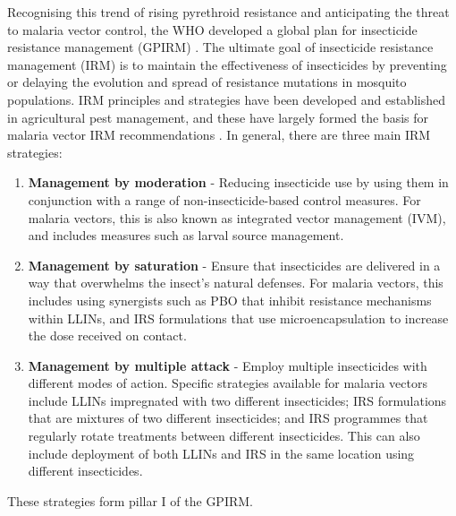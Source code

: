 \documentclass[a4paper,11pt,abstracton,hidelinks]{scrartcl}
\begin{document}
Recognising this trend of rising pyrethroid resistance and anticipating the threat to malaria vector control, the WHO developed a global plan for insecticide resistance management (GPIRM) \citep{WHO2012GPIRM}. 
%
The ultimate goal of insecticide resistance management (IRM) is to maintain the effectiveness of insecticides by preventing or delaying the evolution and spread of resistance mutations in mosquito populations. 
%
IRM principles and strategies have been developed and established in agricultural pest management, and these have largely formed the basis for malaria vector IRM recommendations \citep{Georghiou2005,Sternberg2018}. 
%
In general, there are three main IRM strategies:
%
\begin{enumerate}
%
\item \textbf{Management by moderation} - Reducing insecticide use by using them in conjunction with a range of non-insecticide-based control measures. For malaria vectors, this is also known as integrated vector management (IVM), and includes measures such as larval source management.
%
\item \textbf{Management by saturation} - Ensure that insecticides are delivered in a way that overwhelms the insect's natural defenses. For malaria vectors, this includes using synergists such as PBO that inhibit resistance mechanisms within LLINs, and  IRS formulations that use microencapsulation to increase the dose received on contact.
%
\item \textbf{Management by multiple attack} - Employ multiple insecticides with different modes of action. Specific strategies available for malaria vectors include LLINs impregnated with two different insecticides; IRS formulations that are mixtures of two different insecticides; and IRS programmes that regularly rotate treatments between different insecticides. This can also include deployment of both LLINs and IRS in the same location using different insecticides.
%
\end{enumerate}
%
These strategies form pillar \RN{1} of the GPIRM.
\end{document}
